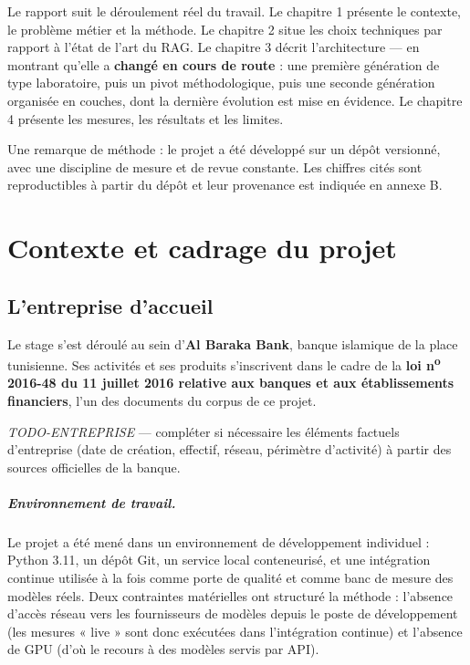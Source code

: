 \documentclass[a4paper,12pt]{report}
\begin{document}
Le rapport suit le déroulement réel du travail. Le chapitre 1 présente le contexte, le problème
métier et la méthode. Le chapitre 2 situe les choix techniques par rapport à l'état de l'art du
RAG. Le chapitre 3 décrit l'architecture — en montrant qu'elle a \textbf{changé en cours de
route} : une première génération de type laboratoire, puis un pivot méthodologique, puis une
seconde génération organisée en couches, dont la dernière évolution est mise en évidence. Le
chapitre 4 présente les mesures, les résultats et les limites.

Une remarque de méthode : le projet a été développé sur un dépôt versionné, avec une discipline de
mesure et de revue constante. Les chiffres cités sont reproductibles à partir du dépôt et leur
provenance est indiquée en annexe B.

\chapter{Contexte et cadrage du projet}

\section{L'entreprise d'accueil}
Le stage s'est déroulé au sein d'\textbf{Al Baraka Bank}, banque islamique de la place tunisienne.
Ses activités et ses produits s'inscrivent dans le cadre de la \textbf{loi n\textsuperscript{o}
2016-48 du 11 juillet 2016 relative aux banques et aux établissements financiers}, l'un des
documents du corpus de ce projet.

\emph{TODO-ENTREPRISE} — compléter si nécessaire les éléments factuels d'entreprise (date de
création, effectif, réseau, périmètre d'activité) à partir des sources officielles de la banque.

\paragraph{Environnement de travail.} Le projet a été mené dans un environnement de développement
individuel : Python 3.11, un dépôt Git, un service local conteneurisé, et une intégration continue
utilisée à la fois comme porte de qualité et comme banc de mesure des modèles réels. Deux
contraintes matérielles ont structuré la méthode : l'absence d'accès réseau vers les fournisseurs
de modèles depuis le poste de développement (les mesures « live » sont donc exécutées dans
l'intégration continue) et l'absence de GPU (d'où le recours à des modèles servis par API).
\end{document}
